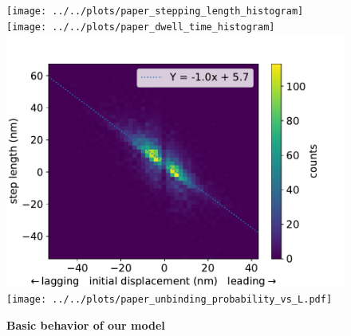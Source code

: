 \documentclass[9pt,twocolumn,twoside]{pnas-new}
\begin{document}

\begin{figure}[tbhp]
  \centering
  \texttt{[image: ../../plots/paper\_stepping\_length\_histogram]}
  \texttt{[image: ../../plots/paper\_dwell\_time\_histogram]}
  \includegraphics[width=\linewidth]{../../plots/paper_displacement_vs_step_length.pdf}
  \texttt{[image: ../../plots/paper\_unbinding\_probability\_vs\_L.pdf]}
\caption{\textbf{Basic behavior of our model}}
\label{fig:}
\end{figure}
\end{document}

